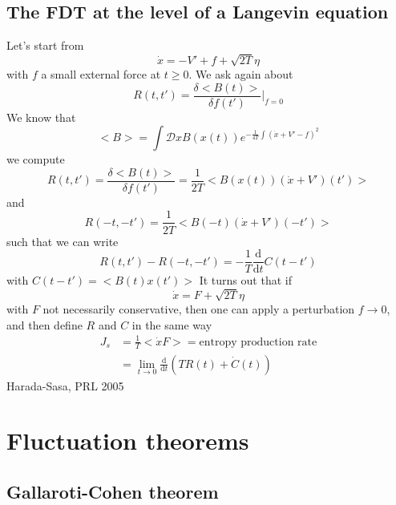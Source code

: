 \documentclass[a4paper]{book}
\theoremstyle{definition}
\theoremstyle{remark}
\begin{document}
\subsection{The FDT at the level of a Langevin equation}
Let's start from 
\begin{equation}
    \dot{x} = -V' + f + \sqrt{2T}\eta 
\end{equation}
with $f$ a small external force at $t \geq 0$. We ask again about 
\begin{equation}
    R(t, t') = \frac{\delta <B(t)>}{\delta f(t')}\Bigg| _{f=0}
\end{equation}
We know that 
\begin{equation}
    <B> = \int \mathcal{D}x B(x(t)) e^{-\frac{1}{4T}\int (\dot{x} + V' - f)^2}
\end{equation}
we compute 
\begin{equation}
    R(t, t') = \frac{\delta<B(t)>}{\delta f(t')} = \frac{1}{2T}<B(x(t))(\dot{x}+V')(t')>
\end{equation}
and
\begin{equation}
    R(-t, -t') = \frac{1}{2T}<B(-t)(\dot{x} + V')(-t')>
\end{equation}
such that we can write
\begin{equation}
    R(t, t') - R(-t, -t') = -\frac{1}{T}\frac{\text{d}}{\text{d}t} C(t-t')
\end{equation}
with $C(t-t') = <B(t)x(t')>$
It turns out that if 
\begin{equation}
    \dot{x} = F + \sqrt{2T}\eta
\end{equation}
with $F$ not necessarily conservative, then one can apply a perturbation $f\rightarrow 0$, and then define $R$ and $C$ in the same way 
\begin{equation}
    \begin{aligned}
        J_s &= \frac{1}{T}<\dot{x} F> = \text{entropy production rate} \\ 
        &= \lim_{t \rightarrow 0} \frac{\text{d}}{\text{d}t} (TR(t) + \dot{C}(t))
    \end{aligned}
\end{equation}
Harada-Sasa, PRL 2005

\section{Fluctuation theorems}

\subsection{Gallaroti-Cohen theorem}
\end{document}
